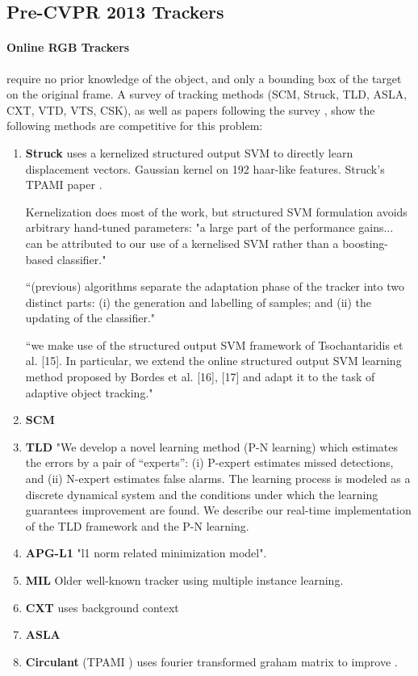 \subsection{Pre-CVPR 2013 Trackers}


\paragraph{Online RGB Trackers} require no prior knowledge of the object, and only a bounding box of the target on the original frame. 
A survey of tracking methods \cite{wu2013online} (SCM, Struck, TLD, ASLA, CXT, VTD, VTS, CSK), as well as papers following the survey \cite{supancic2013self}, show the following methods are competitive for this problem:
\begin{enumerate}
\item \textbf{Struck} \cite{hare2011struck}  uses a kernelized structured output SVM to directly learn displacement vectors. Gaussian kernel on 192 haar-like features. Struck's TPAMI paper \cite{hare2014struck}. 

Kernelization does most of the work, but structured SVM formulation avoids arbitrary hand-tuned parameters: "a large part of the performance gains... can be attributed to our use of a kernelised SVM rather than a boosting-based classifier."

``(previous) algorithms separate the adaptation phase of
the tracker into two distinct parts: (i) the generation and
labelling of samples; and (ii) the updating of the classifier."

``we make use of the structured output SVM
framework of Tsochantaridis et al. [15]. In particular, we
extend the online structured output SVM learning method
proposed by Bordes et al. [16], [17] and adapt it to the task
of adaptive object tracking."

\item \textbf{SCM} \cite{zhong2012robust} 
\item \textbf{TLD} \cite{kalal2012tracking} "We develop a novel learning method (P-N learning) which estimates the
errors by a pair of “experts”: (i) P-expert estimates missed detections, and (ii) N-expert estimates false alarms. The learning process is
modeled as a discrete dynamical system and the conditions under which the learning guarantees improvement are found. We describe
our real-time implementation of the TLD framework and the P-N learning.

\item \textbf{APG-L1} \cite{bao2012real} "l1 norm related minimization model".
\item \textbf{MIL} \cite{babenko2009visual} Older well-known tracker using multiple instance learning.
\item \textbf{CXT} \cite{dinh2011context} uses background context
\item \textbf{ASLA} \cite{jia2012visual} 
\item \textbf{Circulant} \cite{henriques2012exploiting} (TPAMI \cite{henriques2015tracking}) uses fourier transformed graham matrix to improve .


\end{enumerate}

